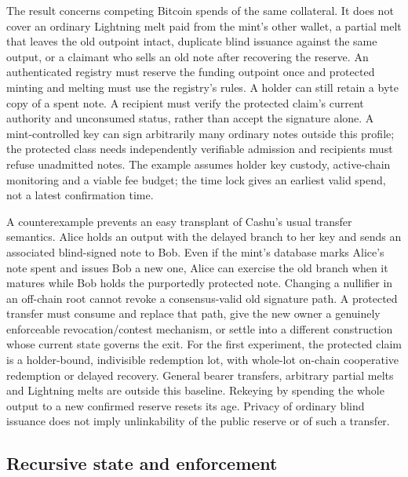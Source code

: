 The result concerns competing Bitcoin spends of the same collateral. It does not cover an ordinary Lightning melt paid from the mint's other wallet, a partial melt that leaves the old outpoint intact, duplicate blind issuance against the same output, or a claimant who sells an old note after recovering the reserve. An authenticated registry must reserve the funding outpoint once and protected minting and melting must use the registry's rules. A holder can still retain a byte copy of a spent note. A recipient must verify the protected claim's current authority and unconsumed status, rather than accept the signature alone. A mint-controlled key can sign arbitrarily many ordinary notes outside this profile; the protected class needs independently verifiable admission and recipients must refuse unadmitted notes. The example assumes holder key custody, active-chain monitoring and a viable fee budget; the time lock gives an earliest valid spend, not a latest confirmation time.

A counterexample prevents an easy transplant of Cashu's usual transfer semantics. Alice holds an output with the delayed branch to her key and sends an associated blind-signed note to Bob. Even if the mint's database marks Alice's note spent and issues Bob a new one, Alice can exercise the old branch when it matures while Bob holds the purportedly protected note. Changing a nullifier in an off-chain root cannot revoke a consensus-valid old signature path. A protected transfer must consume and replace that path, give the new owner a genuinely enforceable revocation/contest mechanism, or settle into a different construction whose current state governs the exit. For the first experiment, the protected claim is a holder-bound, indivisible redemption lot, with whole-lot on-chain cooperative redemption or delayed recovery. General bearer transfers, arbitrary partial melts and Lightning melts are outside this baseline. Rekeying by spending the whole output to a new confirmed reserve resets its age. Privacy of ordinary blind issuance does not imply unlinkability of the public reserve or of such a transfer.

\subsection{Recursive state and enforcement}

